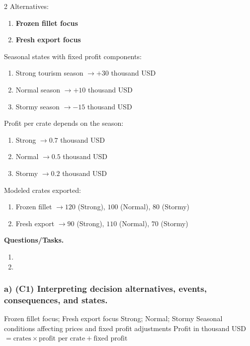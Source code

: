 	\begin{multicols}{2}
		Alternatives:
		\begin{enumerate}[label=\arabic*.]
			\item \textbf{Frozen fillet focus}
			\item \textbf{Fresh export focus}
		\end{enumerate}
	
		Seasonal states with fixed profit components:
		\begin{enumerate}[label=\arabic*.]
			\item Strong tourism season $\to +30$ thousand USD
			\item Normal season $\to +10$ thousand USD
			\item Stormy season $\to -15$ thousand USD
		\end{enumerate}
	
			\columnbreak
	
		Profit per crate depends on the season:
		\begin{enumerate}[label=\arabic*.]
			\item Strong $\to 0.7$ thousand USD
			\item Normal $\to 0.5$ thousand USD
			\item Stormy $\to 0.2$ thousand USD
		\end{enumerate}
	
		Modeled crates exported:
		\begin{enumerate}[label=\arabic*.]
			\item Frozen fillet $\to 120$ (Strong), $100$ (Normal), $80$ (Stormy)
			\item Fresh export $\to 90$ (Strong), $110$ (Normal), $70$ (Stormy)
		\end{enumerate}
	\end{multicols}

	\textbf{Questions/Tasks.}
	\begin{enumerate}[label=\textbf{\alph*)}]
		\item {}
		\item {}
	\end{enumerate}
	
	\subsubsection*{a) \textbf{(C1)} Interpreting decision alternatives, events, consequences, and states.}
	\label{subsec:problem14-seafood-export-licenses-c1}
	\DecisionElementsTable
	{Frozen fillet focus; Fresh export focus}
	{Strong; Normal; Stormy}
	{Seasonal conditions affecting prices and fixed profit adjustments}
	{Profit in thousand USD $= \text{crates} \times \text{profit per crate} + \text{fixed profit}$}
	
